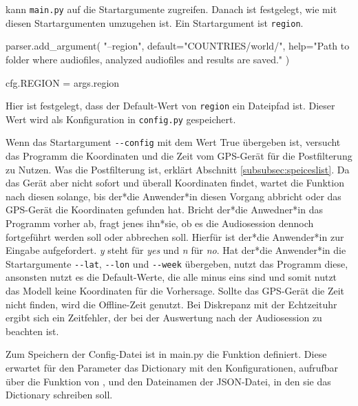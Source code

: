 kann \lstinline{main.py} auf die Startargumente zugreifen.
Danach ist festgelegt, wie mit diesen Startargumenten umzugehen ist. Ein Startargument ist \texttt{region}.
\begin{python}
parser.add_argument(
        "--region", default="COUNTRIES/world/", help="Path to folder where audiofiles, analyzed audiofiles and results are saved."
)

cfg.REGION = args.region{}

\end{python}

Hier ist festgelegt, dass der Default-Wert von \texttt{region} ein Dateipfad ist. Dieser Wert wird als Konfiguration in \lstinline{config.py} gespeichert.


Wenn das Startargument \texttt{-{}-config} mit dem Wert True übergeben ist, versucht das Programm die Koordinaten und die Zeit vom GPS-Gerät für die Postfilterung zu Nutzen. Was die Postfilterung ist, erklärt Abschnitt \ref{subsubsec:speiceslist}. Da das Gerät aber nicht sofort und überall Koordinaten findet, wartet die Funktion  nach diesen solange, bis der*die Anwender*in diesen Vorgang abbricht oder das GPS-Gerät die Koordinaten gefunden hat. Bricht der*die Anwedner*in das Programm vorher ab, fragt jenes ihn*sie, ob es die Audiosession dennoch fortgeführt werden soll oder abbrechen soll. Hierfür ist der*die Anwender*in zur Eingabe aufgefordert. \textit{y} steht für \textit{yes} und \textit{n} für \textit{no}.
Hat der*die Anwender*in die Startargumente \texttt{-{}-lat}, \texttt{-{}-lon} und \texttt{-{}-week} übergeben, nutzt das Programm diese, ansonsten nutzt es die Default-Werte, die alle minus eins sind und somit nutzt das Modell keine Koordinaten für die Vorhersage. Sollte das GPS-Gerät die Zeit nicht finden, wird die Offline-Zeit genutzt. Bei Diskrepanz mit der Echtzeituhr ergibt sich ein Zeitfehler, der bei der Auswertung nach der Audiosession zu beachten ist.



Zum Speichern der Config-Datei ist in main.py die Funktion  definiert. Diese erwartet für den Parameter  das Dictionary mit den Konfigurationen, aufrufbar über die Funktion  von , und den Dateinamen der JSON-Datei, in den sie das Dictionary schreiben soll.

